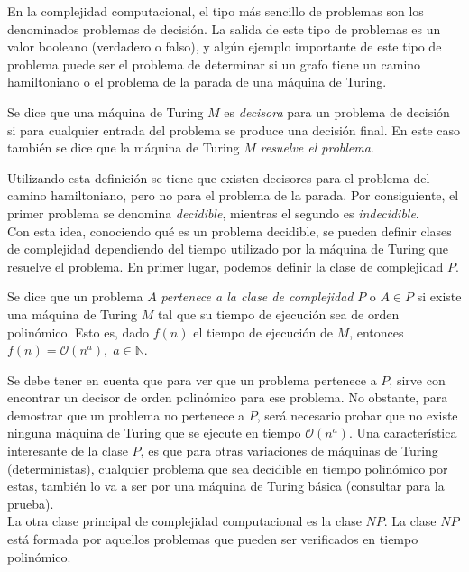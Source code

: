 En la complejidad computacional, el tipo más sencillo de problemas son los denominados problemas de decisión. La salida de este tipo de problemas es un valor booleano (verdadero o falso), y algún ejemplo importante de este tipo de problema puede ser el problema de determinar si un grafo tiene un camino hamiltoniano o el problema de la parada de una máquina de Turing.

\begin{definition}
    Se dice que una máquina de Turing $M$ es \textit{decisora} para un problema de decisión si para cualquier entrada del problema se produce una decisión final. En este caso también se dice que la máquina de Turing $M$ \textit{resuelve el problema}.
\end{definition}

Utilizando esta definición se tiene que existen decisores para el problema del camino hamiltoniano, pero no para el problema de la parada. Por consiguiente, el primer problema se denomina \textit{decidible}, mientras el segundo es \textit{indecidible}.\\

Con esta idea, conociendo qué es un problema decidible, se pueden definir clases de complejidad dependiendo del tiempo utilizado por la máquina de Turing que resuelve el problema. En primer lugar, podemos definir la clase de complejidad $P$.

\begin{definition}
    Se dice que un problema $A$ \textit{pertenece a la clase de complejidad} $P$ o $A\in P$ si existe una máquina de Turing $M$ tal que su tiempo de ejecución sea de orden polinómico. Esto es, dado $f(n)$ el tiempo de ejecución de $M$, entonces $f(n)=\mathcal{O}(n^a),\;a\in\mathbb{N}$.
\end{definition}

Se debe tener en cuenta que para ver que un problema pertenece a $P$, sirve con encontrar un decisor de orden polinómico para ese problema. No obstante, para demostrar que un problema no pertenece a $P$, será necesario probar que no existe ninguna máquina de Turing que se ejecute en tiempo $\mathcal{O}(n^a)$. Una característica interesante de la clase $P$, es que para otras variaciones de máquinas de Turing (deterministas), cualquier problema que sea decidible en tiempo polinómico por estas, también lo va a ser por una máquina de Turing básica (consultar \cite{sipser-cc} para la prueba).\\

La otra clase principal de complejidad computacional es la clase $NP$. La clase $NP$ está formada por aquellos problemas que pueden ser verificados en tiempo polinómico.

